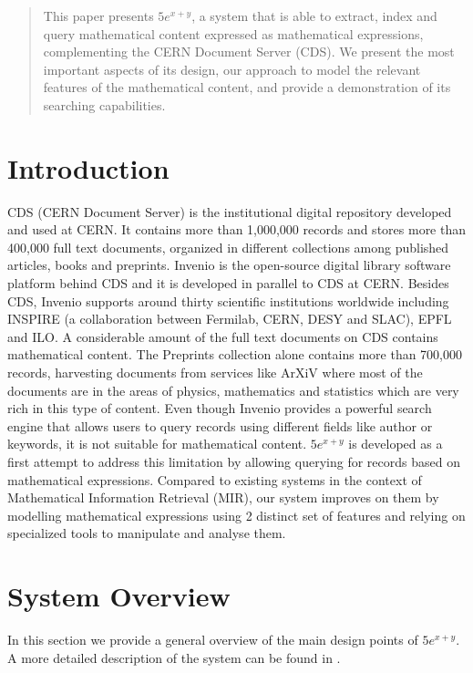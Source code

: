 \documentclass{sig-alternate}
\begin{document}
\maketitle
\begin{abstract}
This paper presents $5e^{x+y}$, a system that is able to extract, index and query mathematical content expressed as mathematical expressions, complementing the CERN Document Server (CDS)\cite{CDS1}. We present the most important aspects of its design, our approach to model the relevant features of the mathematical content, and provide a demonstration of its searching capabilities.

\end{abstract}

\section{Introduction}
CDS (CERN Document Server) is the institutional digital repository developed and used at CERN\cite{CERN}. It contains more than 1,000,000 records and stores more than 400,000 full text documents, organized in different collections among published articles, books and preprints. Invenio\cite{invenio} is the open-source digital library software platform behind CDS and it is developed in parallel to CDS at CERN. Besides CDS, Invenio supports around thirty scientific institutions worldwide including INSPIRE (a collaboration between Fermilab, CERN, DESY and SLAC), EPFL and ILO. 
A considerable amount of the full text documents on CDS contains mathematical content. The Preprints collection alone contains more than 700,000 records, harvesting documents from services like ArXiV\cite{arxiv} where most of the documents are in the areas of physics, mathematics and statistics which are very rich in this type of content. Even though Invenio provides a powerful search engine that allows users to query records using different fields like author or keywords, it is not suitable for mathematical content. $5e^{x+y}$ is developed as a first attempt to address this limitation by allowing querying for records based on mathematical expressions. Compared to existing systems in the context of Mathematical Information Retrieval (MIR), our system improves on them by modelling mathematical expressions using 2 distinct set of features and relying on specialized tools to manipulate and analyse them.

\section{System Overview}
In this section we provide a general overview of the main design points of $5e^{x+y}$. A more detailed description of the system can be found in \cite{mathexplorerweb}.
\end{document}
